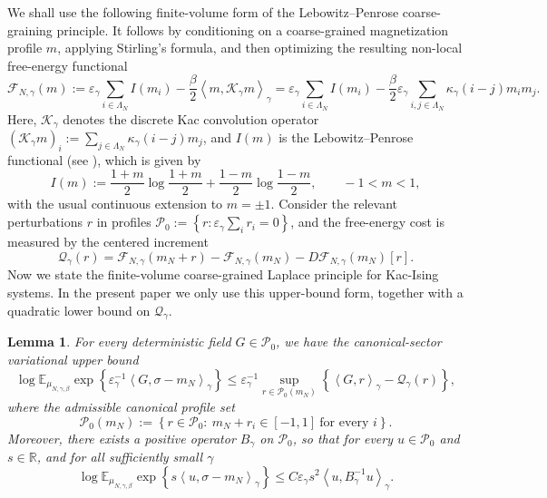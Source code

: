 \documentclass{article}
\newtheorem{lemma}{Lemma}
\begin{document}
We shall use the following finite-volume form of the Lebowitz--Penrose coarse-graining principle.  
It follows by conditioning on a coarse-grained magnetization profile \(m\), applying Stirling's formula, and then optimizing the resulting non-local free-energy functional
\[
\mathcal F_{N,\gamma}(m) := \varepsilon_\gamma\sum_{i\in\Lambda_N} I(m_i) - \frac{\beta}{2}
\left\langle m,\mathcal K_\gamma m\right\rangle_\gamma =  \varepsilon_\gamma\sum_{i\in\Lambda_N} I(m_i) - \frac{\beta}{2}\varepsilon_\gamma
\sum_{i,j\in\Lambda_N}
\kappa_\gamma(i-j)m_i m_j.
\]
Here, \(\mathcal K_\gamma\) denotes the discrete Kac convolution operator
$(\mathcal K_\gamma m)_i := \sum_{j\in\Lambda_N}\kappa_\gamma(i-j)m_j$,
and $I(m)$ is the Lebowitz--Penrose functional (see \cite{LP1966}), which is given by
\[
I(m) := \frac{1+m}{2}\log\frac{1+m}{2} + \frac{1-m}{2}\log\frac{1-m}{2}, \qquad -1<m<1,
\]
with the usual continuous extension to \(m=\pm1\).
Consider the relevant perturbations $r$ in profiles $\mathcal P_0:=\left\{r:\varepsilon_\gamma\sum_i r_i=0\right\}$, 
and the free-energy cost is measured by the centered increment
\[
\mathcal Q_\gamma(r)
=
\mathcal F_{N,\gamma}(m_N+r)
-
\mathcal F_{N,\gamma}(m_N)
-
D\mathcal F_{N,\gamma}(m_N)[r].
\]
Now we state the finite-volume coarse-grained Laplace principle for Kac-Ising systems.  In the present paper we only use this upper-bound form, together with a quadratic lower bound on
\(\mathcal Q_\gamma\).

\begin{lemma}\label{lem:finite-volume-LP-variational}
For every deterministic field \(G\in\mathcal P_0\), we have the canonical-sector variational upper bound
\begin{equation}\label{eq:finite-volume-LP}
\log \mathbb E_{\mu_{N,\gamma,\beta}}
\exp\left\{
\varepsilon_\gamma^{-1}
\left\langle G,\sigma-m_N\right\rangle_\gamma
\right\}
\le \varepsilon_\gamma^{-1}
\sup_{r\in\mathcal P_0(m_N)}
\left\{
\left\langle G,r\right\rangle_\gamma - \mathcal Q_\gamma(r)
\right\},
\end{equation}
where the admissible canonical profile set
\[
\mathcal P_0(m_N)
:=
\left\{
r\in\mathcal P_0:\ m_N+r_i\in[-1,1]\ \text{for every }i
\right\}.
\]
Moreover, there exists a positive operator \(B_\gamma\) on \(\mathcal P_0\),
so that for every \(u\in\mathcal P_0\) and \(s\in\mathbb R\), and for all sufficiently small $\gamma$
\begin{equation}
\log
\mathbb E_{\mu_{N,\gamma,\beta}}
\exp\left\{
s\left\langle u,\sigma-m_N\right\rangle_\gamma
\right\}
\le
C\varepsilon_\gamma s^2
\left\langle u,B_\gamma^{-1}u\right\rangle_\gamma .
\label{eq:finite-volume-LP-laplace-bound}
\end{equation}
\end{lemma}
\end{document}

